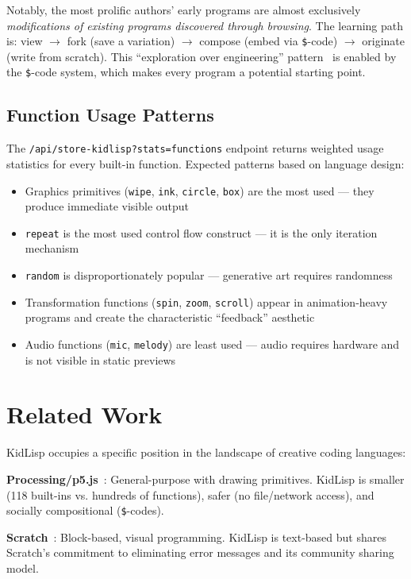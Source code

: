 \documentclass[sigconf,nonacm]{acmart}
\begin{document}
Notably, the most prolific authors' early programs are almost exclusively \emph{modifications of existing programs discovered through browsing}. The learning path is: view $\rightarrow$ fork (save a variation) $\rightarrow$ compose (embed via \texttt{\$}-code) $\rightarrow$ originate (write from scratch). This ``exploration over engineering'' pattern~\cite{compton2015casual} is enabled by the \texttt{\$}-code system, which makes every program a potential starting point.

\subsection{Function Usage Patterns}

The \texttt{/api/store-kidlisp?stats=functions} endpoint returns weighted usage statistics for every built-in function. Expected patterns based on language design:

\begin{itemize}
  \item Graphics primitives (\texttt{wipe}, \texttt{ink}, \texttt{circle}, \texttt{box}) are the most used --- they produce immediate visible output
  \item \texttt{repeat} is the most used control flow construct --- it is the only iteration mechanism
  \item \texttt{random} is disproportionately popular --- generative art requires randomness
  \item Transformation functions (\texttt{spin}, \texttt{zoom}, \texttt{scroll}) appear in animation-heavy programs and create the characteristic ``feedback'' aesthetic
  \item Audio functions (\texttt{mic}, \texttt{melody}) are least used --- audio requires hardware and is not visible in static previews
\end{itemize}

\section{Related Work}

KidLisp occupies a specific position in the landscape of creative coding languages:

\textbf{Processing/p5.js}~\cite{reas2007processing}: General-purpose with drawing primitives. KidLisp is smaller (118 built-ins vs. hundreds of functions), safer (no file/network access), and socially compositional (\texttt{\$}-codes).

\textbf{Scratch}~\cite{resnick2009scratch}: Block-based, visual programming. KidLisp is text-based but shares Scratch's commitment to eliminating error messages and its community sharing model.
\end{document}
